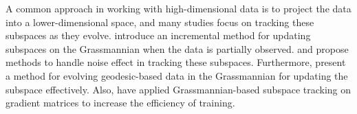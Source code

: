 A common approach in working with high-dimensional data is to project the data into a lower-dimensional space, and many studies focus on tracking these subspaces as they evolve. \citet{balzano2011onlineidentificationtrackingsubspaces} introduce an incremental method for updating subspaces on the Grassmannian when the data is partially observed. \citet{zhang2016globalconvergencegrassmanniangradient} and \citet{kasai2017fastonlinelowranktensor} propose methods to handle noise effect in tracking these subspaces. Furthermore, \citet{blocker2023dynamicsubspaceestimationgrassmannian} present a method for evolving geodesic-based data in the Grassmannian for updating the subspace effectively. Also, \citet{rajabi2024optimizing} have applied Grassmannian-based subspace tracking on gradient matrices to increase the efficiency of training. 